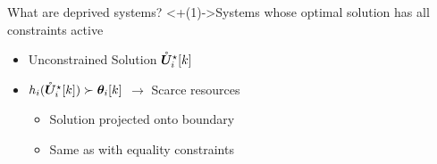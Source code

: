 \documentclass[aspectratio=169]{beamer}
\begin{document}
\begin{frame}{What are deprived systems?}{}
  \centering
  \onslide<+(1)->{Systems whose optimal solution has all constraints active}

  \begin{minipage}[t]{.55\linewidth}
    \begin{itemize}[<+(2)->]
      \item Unconstrained Solution $\mathring{\boldsymbol{U}}^{\star}_i[k]$
      \item $h_{i}(\optuncUik) \succ\thetaik$ $\to$ Scarce resources
            \begin{itemize}
              \item Solution projected onto boundary
              \item Same as with equality constraints\footnotemark

            \end{itemize}
    \end{itemize}


\end{minipage}
\end{frame}
\end{document}
